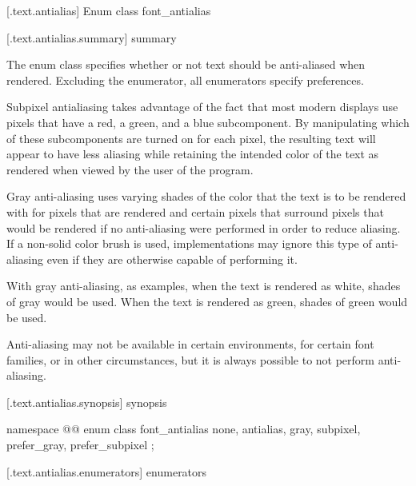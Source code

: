 
 [\iotwod.text.antialias] {Enum class font_antialias}

 [\iotwod.text.antialias.summary] { summary}

\pnum
The  enum class specifies whether or not text should be anti-aliased when rendered. Excluding the  enumerator, all enumerators specify preferences.

\pnum
Subpixel antialiasing takes advantage of the fact that most modern displays use pixels that have a red, a green, and a blue subcomponent. By manipulating which of these subcomponents are turned on for each pixel, the resulting text will appear to have less aliasing while retaining the intended color of the text as rendered when viewed by the user of the program.

\pnum
Gray anti-aliasing uses varying shades of the color that the text is to be rendered with for pixels that are rendered and certain pixels that surround pixels that would be rendered if no anti-aliasing were performed in order to reduce aliasing. If a non-solid color brush is used, implementations may ignore this type of anti-aliasing even if they are otherwise capable of performing it.

\pnum
\begin{note}
With gray anti-aliasing, as examples, when the text is rendered as white, shades of gray would be used. When the text is rendered as green, shades of green would be used.
\end{note}

\pnum
\begin{note}
Anti-aliasing may not be available in certain environments, for certain font families, or in other circumstances, but it is always possible to not perform anti-aliasing.
\end{note}

 [\iotwod.text.antialias.synopsis] { synopsis}

\begin{codeblock}
namespace @\fullnamespace{}@ {
  enum class font_antialias {
    none,
    antialias,
    gray,
    subpixel,
    prefer_gray,
    prefer_subpixel
  };
}
\end{codeblock}

 [\iotwod.text.antialias.enumerators] { enumerators}

